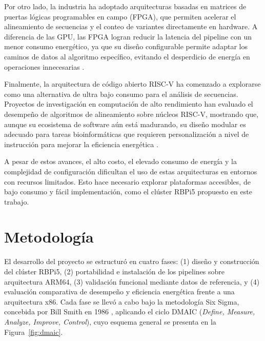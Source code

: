 \documentclass[12pt,oneside,spanish]{book}
\begin{document}
    Por otro lado, la industria ha adoptado arquitecturas basadas en matrices de puertas lógicas programables en campo (FPGA), que permiten acelerar el alineamiento de secuencias y el conteo de variantes directamente en hardware. A diferencia de las GPU, las FPGA logran reducir la latencia del pipeline con un menor consumo energético, ya que su diseño configurable permite adaptar los caminos de datos al algoritmo específico, evitando el desperdicio de energía en operaciones innecesarias \citep{robinson2021hardware}.
    \newpage
    
    Finalmente, la arquitectura de código abierto RISC-V \citep{gomezsanchez2023riscv} ha comenzado a explorarse como una alternativa de ultra bajo consumo para el análisis de secuencias. Proyectos de investigación en computación de alto rendimiento han evaluado el desempeño de algoritmos de alineamiento sobre núcleos RISC-V, mostrando que, aunque su ecosistema de software aún está madurando, su diseño modular es adecuado para tareas bioinformáticas que requieren personalización a nivel de instrucción para mejorar la eficiencia energética \citep{gomezsanchez2023riscv, pyrhonen2025energy}.
    
    A pesar de estos avances, el alto costo, el elevado consumo de energía y la complejidad de configuración dificultan el uso de estas arquitecturas en entornos con recursos limitados. Esto hace necesario explorar plataformas accesibles, de bajo consumo y fácil implementación, como el clúster RBPi5 propuesto en este trabajo.
    
    
    \chapter{Metodología}
    \label{cap:metodologia}
    
    El desarrollo del proyecto se estructuró en cuatro fases: (1) diseño y construcción del clúster RBPi5, (2) portabilidad e instalación de los pipelines sobre arquitectura ARM64, (3) validación funcional mediante datos de referencia, y (4) evaluación comparativa de desempeño y eficiencia energética frente a una arquitectura x86. Cada fase se llevó a cabo bajo la metodología Six Sigma, concebida por Bill Smith en 1986 \citep{purdue2021sixsigma}, aplicando el ciclo DMAIC (\textit{Define, Measure, Analyze, Improve, Control}), cuyo esquema general se presenta en la Figura~\ref{fig:dmaic}.
    
\end{document}
